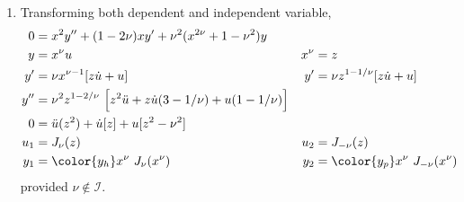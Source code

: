 \begin{enumerate}
    \item Transforming both dependent and independent variable,
          \begin{align}
              0       & = x^2y'' + (1-2\nu)xy' + \nu^2(x^{2\nu} +1 - \nu^2)y   \\
              y       & = x^{\nu}u                                           &
              x^{\nu} & = z                                                    \\
              y'      & = \nu x^{\nu-1} [z \dot{u} + u]                      &
              y'      & = \nu z^{1 - 1/\nu} [z \dot{u} + u]                    \\
              y''     & = \nu^2 z^{1 - 2/\nu}\ \Big[z^2\ddot{u}
              + z\dot{u}(3 - 1/\nu) + u(1 - 1/\nu) \Big]                       \\
              0       & = \ddot{u}(z^2) + \dot{u} [z]
              + u[z^2 - \nu^2]                                                 \\
              u_1     & =  J_{\nu}(z)                                        &
              u_2     & =  J_{-\nu}(z)                                         \\
              y_1     & = \color{y_h}x^\nu\ J_{\nu}(x^\nu)                   &
              y_2     & = \color{y_p}x^\nu\ J_{-\nu}(x^\nu)
          \end{align}
          provided $ \nu \not\in \mathcal{I}$.


\end{enumerate}
